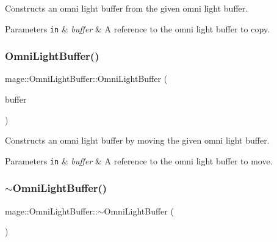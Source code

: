 Constructs an omni light buffer from the given omni light buffer.


\begin{DoxyParams}[1]{Parameters}
\mbox{\tt in}  & {\em buffer} & A reference to the omni light buffer to copy. \\
\hline
\end{DoxyParams}
\hypertarget{structmage_1_1_omni_light_buffer_a78c5a4066af4c60cf5579245d5f08f56}{}\label{structmage_1_1_omni_light_buffer_a78c5a4066af4c60cf5579245d5f08f56} 
\subsubsection{\texorpdfstring{Omni\+Light\+Buffer()}{OmniLightBuffer()}\hspace{0.1cm}{\footnotesize\ttfamily [3/3]}}
{\footnotesize\ttfamily mage\+::\+Omni\+Light\+Buffer\+::\+Omni\+Light\+Buffer (\begin{DoxyParamCaption}\item[{\hyperlink{structmage_1_1_omni_light_buffer}{Omni\+Light\+Buffer} \&\&}]{buffer }\end{DoxyParamCaption})\hspace{0.3cm}{\ttfamily [default]}}

Constructs an omni light buffer by moving the given omni light buffer.


\begin{DoxyParams}[1]{Parameters}
\mbox{\tt in}  & {\em buffer} & A reference to the omni light buffer to move. \\
\hline
\end{DoxyParams}
\hypertarget{structmage_1_1_omni_light_buffer_a80869a9637c8b3a40ee6da63b247faed}{}\label{structmage_1_1_omni_light_buffer_a80869a9637c8b3a40ee6da63b247faed} 
\subsubsection{\texorpdfstring{$\sim$\+Omni\+Light\+Buffer()}{~OmniLightBuffer()}}
{\footnotesize\ttfamily mage\+::\+Omni\+Light\+Buffer\+::$\sim$\+Omni\+Light\+Buffer (\begin{DoxyParamCaption}{ }\end{DoxyParamCaption})\hspace{0.3cm}{\ttfamily [default]}}

